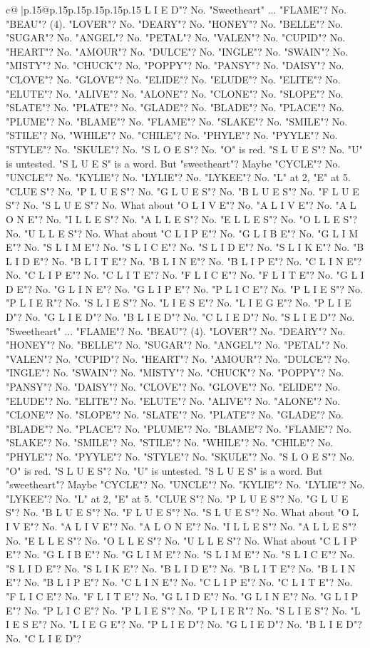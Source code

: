 \documentclass{article}
\begin{document}
{\begin{supertabular}{c@{$\;$}|p{.15\linewidth}@{}p{.15\linewidth}p{.15\linewidth}p{.15\linewidth}p{.15\linewidth}p{.15\linewidth}}
{{{L I E D"? No. "Sweetheart" ... "FLAME"? No. "BEAU"? (4). "LOVER"? No. "DEARY"? No. "HONEY"? No. "BELLE"? No. "SUGAR"? No. "ANGEL"? No. "PETAL"? No. "VALEN"? No. "CUPID"? No. "HEART"? No. "AMOUR"? No. "DULCE"? No. "INGLE"? No. "SWAIN"? No. "MISTY"? No. "CHUCK"? No. "POPPY"? No. "PANSY"? No. "DAISY"? No. "CLOVE"? No. "GLOVE"? No. "ELIDE"? No. "ELUDE"? No. "ELITE"? No. "ELUTE"? No. "ALIVE"? No. "ALONE"? No. "CLONE"? No. "SLOPE"? No. "SLATE"? No. "PLATE"? No. "GLADE"? No. "BLADE"? No. "PLACE"? No. "PLUME"? No. "BLAME"? No. "FLAME"? No. "SLAKE"? No. "SMILE"? No. "STILE"? No. "WHILE"? No. "CHILE"? No. "PHYLE"? No. "PYYLE"? No. "STYLE"? No. "SKULE"? No. "S L O E S"? No. "O" is red. "S L U E S"? No. "U" is untested. "S L U E S" is a word. But "sweetheart"? Maybe "CYCLE"? No. "UNCLE"? No. "KYLIE"? No. "LYLIE"? No. "LYKEE"? No. "L" at 2, "E" at 5. "CLUE S"? No. "P L U E S"? No. "G L U E S"? No. "B L U E S"? No. "F L U E S"? No. "S L U E S"? No. What about "O L I V E"? No. "A L I V E"? No. "A L O N E"? No. "I L L E S"? No. "A L L E S"? No. "E L L E S"? No. "O L L E S"? No. "U L L E S"? No. What about "C L I P E"? No. "G L I B E"? No. "G L I M E"? No. "S L I M E"? No. "S L I C E"? No. "S L I D E"? No. "S L I K E"? No. "B L I D E"? No. "B L I T E"? No. "B L I N E"? No. "B L I P E"? No. "C L I N E"? No. "C L I P E"? No. "C L I T E"? No. "F L I C E"? No. "F L I T E"? No. "G L I D E"? No. "G L I N E"? No. "G L I P E"? No. "P L I C E"? No. "P L I E S"? No. "P L I E R"? No. "S L I E S"? No. "L I E S E"? No. "L I E G E"? No. "P L I E D"? No. "G L I E D"? No. "B L I E D"? No. "C L I E D"? No. "S L I E D"? No. "Sweetheart" ... "FLAME"? No. "BEAU"? (4). "LOVER"? No. "DEARY"? No. "HONEY"? No. "BELLE"? No. "SUGAR"? No. "ANGEL"? No. "PETAL"? No. "VALEN"? No. "CUPID"? No. "HEART"? No. "AMOUR"? No. "DULCE"? No. "INGLE"? No. "SWAIN"? No. "MISTY"? No. "CHUCK"? No. "POPPY"? No. "PANSY"? No. "DAISY"? No. "CLOVE"? No. "GLOVE"? No. "ELIDE"? No. "ELUDE"? No. "ELITE"? No. "ELUTE"? No. "ALIVE"? No. "ALONE"? No. "CLONE"? No. "SLOPE"? No. "SLATE"? No. "PLATE"? No. "GLADE"? No. "BLADE"? No. "PLACE"? No. "PLUME"? No. "BLAME"? No. "FLAME"? No. "SLAKE"? No. "SMILE"? No. "STILE"? No. "WHILE"? No. "CHILE"? No. "PHYLE"? No. "PYYLE"? No. "STYLE"? No. "SKULE"? No. "S L O E S"? No. "O" is red. "S L U E S"? No. "U" is untested. "S L U E S" is a word. But "sweetheart"? Maybe "CYCLE"? No. "UNCLE"? No. "KYLIE"? No. "LYLIE"? No. "LYKEE"? No. "L" at 2, "E" at 5. "CLUE S"? No. "P L U E S"? No. "G L U E S"? No. "B L U E S"? No. "F L U E S"? No. "S L U E S"? No. What about "O L I V E"? No. "A L I V E"? No. "A L O N E"? No. "I L L E S"? No. "A L L E S"? No. "E L L E S"? No. "O L L E S"? No. "U L L E S"? No. What about "C L I P E"? No. "G L I B E"? No. "G L I M E"? No. "S L I M E"? No. "S L I C E"? No. "S L I D E"? No. "S L I K E"? No. "B L I D E"? No. "B L I T E"? No. "B L I N E"? No. "B L I P E"? No. "C L I N E"? No. "C L I P E"? No. "C L I T E"? No. "F L I C E"? No. "F L I T E"? No. "G L I D E"? No. "G L I N E"? No. "G L I P E"? No. "P L I C E"? No. "P L I E S"? No. "P L I E R"? No. "S L I E S"? No. "L I E S E"? No. "L I E G E"? No. "P L I E D"? No. "G L I E D"? No. "B L I E D"? No. "C L I E D"? }}}
\end{supertabular}}
\end{document}
